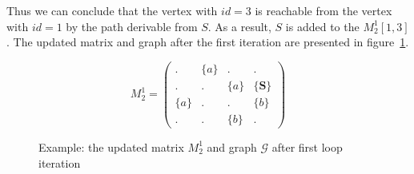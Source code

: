 Thus we can conclude that the vertex with $id = 3$ is reachable from the vertex with $id = 1$ by the path derivable from $S$.
As a result, $S$ is added to the $M_2^1[1,3]$.
The updated matrix and graph after the first iteration are presented in figure~\ref{example:iteration1res}.

\begin{figure}[h]
    \begin{subfigure}[]{0.5\textwidth}
    \centering
    $$
    M_2^1 =
    \begin{pmatrix}
    . & \{a\} & . & .     \\
    . & . & \{a\} & \{\textbf{S}\} \\
    \{a\} & . & . & \{b\} \\
    . & . & \{b\} & .
    \end{pmatrix}
    $$
    \end{subfigure}
    \begin{subfigure}[]{0.4\textwidth}
    \centering
    \end{subfigure}
    \caption{Example: the updated matrix $M_2^1$ and graph $\mathcal{G}$ after first loop iteration}
    \label{example:iteration1res}
\end{figure}


